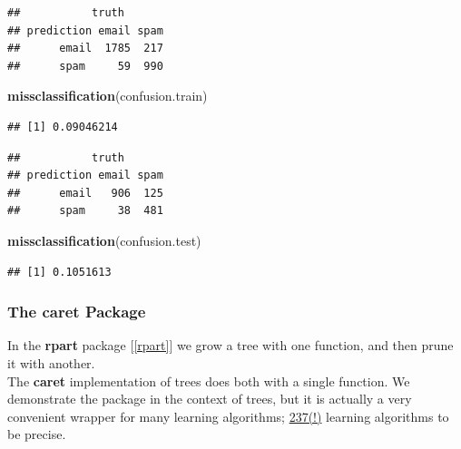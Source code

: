 \documentclass[]{book}
\newenvironment{Shaded}{\begin{snugshade}}{\end{snugshade}}
\newcommand{\KeywordTok}[1]{\textcolor[rgb]{0.13,0.29,0.53}{\textbf{#1}}}
\newcommand{\DataTypeTok}[1]{\textcolor[rgb]{0.13,0.29,0.53}{#1}}
\newcommand{\DecValTok}[1]{\textcolor[rgb]{0.00,0.00,0.81}{#1}}
\newcommand{\StringTok}[1]{\textcolor[rgb]{0.31,0.60,0.02}{#1}}
\newcommand{\CommentTok}[1]{\textcolor[rgb]{0.56,0.35,0.01}{\textit{#1}}}
\newcommand{\OperatorTok}[1]{\textcolor[rgb]{0.81,0.36,0.00}{\textbf{#1}}}
\newcommand{\NormalTok}[1]{#1}
\theoremstyle{definition}
\theoremstyle{definition}
\theoremstyle{definition}
\theoremstyle{remark}
\begin{document}
\begin{verbatim}
##           truth
## prediction email spam
##      email  1785  217
##      spam     59  990
\end{verbatim}

\begin{Shaded}
\begin{Highlighting}[]
\KeywordTok{missclassification}\NormalTok{(confusion.train)}
\end{Highlighting}
\end{Shaded}

\begin{verbatim}
## [1] 0.09046214
\end{verbatim}

\begin{Shaded}
\end{Shaded}

\begin{verbatim}
##           truth
## prediction email spam
##      email   906  125
##      spam     38  481
\end{verbatim}

\begin{Shaded}
\begin{Highlighting}[]
\KeywordTok{missclassification}\NormalTok{(confusion.test)}
\end{Highlighting}
\end{Shaded}

\begin{verbatim}
## [1] 0.1051613
\end{verbatim}

\subsubsection{The caret Package}\label{caret}

In the \textbf{rpart} package {[}\ref{rpart}{]} we grow a tree with one
function, and then prune it with another.\\
The \textbf{caret} implementation of trees does both with a single
function. We demonstrate the package in the context of trees, but it is
actually a very convenient wrapper for many learning algorithms;
\href{http://topepo.github.io/caret/available-models.html\#}{237(!)}
learning algorithms to be precise.
\end{document}
